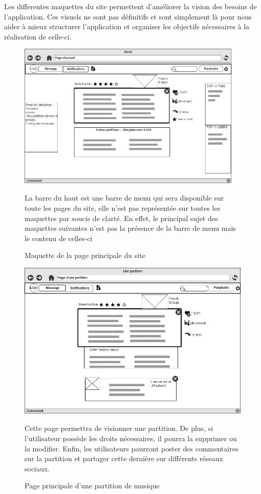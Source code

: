 Les differentes maquettes du site permettent d'améliorer la vision des besoins de l'application.
Ces visuels ne sont pas définitifs et sont simplement là pour nous aider à mieux structurer l'application et organiser les objectifs nécessaires à la réalisation de celle-ci.
\begin{figure}[H]

\centering
\includegraphics[scale=0.5]{Home}
\caption{Maquette de la page principale du site}
La barre du haut est une barre de menu qui sera
disponible sur toute les pages du site, elle n'est pas
représentée sur toutes les maquettes par soucis de clarté. En
effet, le principal sujet des maquettes suivantes n'est pas
la présence de la barre de menu mais le contenu de celles-ci
\end{figure}

\begin{figure}[H]

\centering
\includegraphics[scale=0.5]{Tab}
\caption{Page principale d'une partition de musique}
Cette page permettra de visionner une partition.
De plus, si l'utilisateur possède les droits nécessaires, il pourra la supprimer ou la modifier.
Enfin, les utilisateurs pourront poster des commentaires sur la partition et partager cette dernière sur différents réseaux sociaux.
\end{figure}


